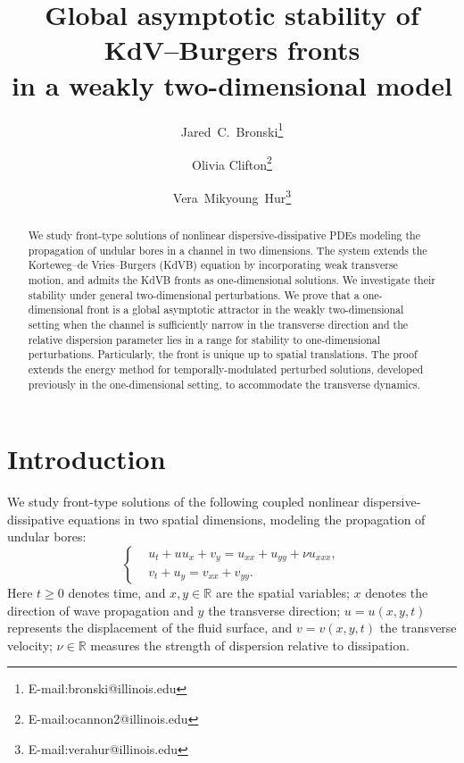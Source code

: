 \documentclass[final,11pt]{article}
\title{Global asymptotic stability of KdV--Burgers fronts \protect\\ 
in a weakly two-dimensional model}
\author[1]{Jared~C.~Bronski\thanks{E-mail:bronski@illinois.edu}}
\author[1]{Olivia Clifton\thanks{E-mail:ocannon2@illinois.edu}}
\author[1]{Vera~Mikyoung~Hur\thanks{E-mail:verahur@illinois.edu}}
\affil[1]{Department of Mathematics, University of Illinois Urbana-Champaign, \protect\\
Urbana, IL 61801, USA}
\renewcommand{\geq}{\geqslant}
\theoremstyle{definition} %
\theoremstyle{plain}
\theoremstyle{definition} %
\theoremstyle{remark}
\begin{document}
\maketitle

\begin{abstract}
We study front-type solutions of nonlinear dispersive-dissipative PDEs modeling the propagation of undular bores in a channel in two dimensions. The system extends the Korteweg--de Vries--Burgers (KdVB) equation by incorporating weak transverse motion, and admits the KdVB fronts as one-dimensional solutions. We investigate their stability under general two-dimensional perturbations. We prove that a one-dimensional front is a global asymptotic attractor in the weakly two-dimensional setting when the channel is sufficiently narrow in the transverse direction and the relative dispersion parameter lies in a range for stability to one-dimensional perturbations. Particularly, the front is unique up to spatial translations. The proof extends the energy method for temporally-modulated perturbed solutions, developed previously in the one-dimensional setting, to accommodate the transverse dynamics.
\end{abstract}

\section{Introduction}\label{sec:intro}
We study front-type solutions of the following coupled nonlinear dispersive-dissipative equations in two spatial dimensions, modeling the propagation of undular bores:
\begin{equation}\label{e:Rajopadhye}
\left\{\begin{aligned}
&u_t  + u u_x  + v_y = u_{xx} + u_{yy} + \nu u_{xxx}, \\
& v_t + u_y = v_{xx}+v_{yy}.
\end{aligned}\right.
\end{equation}
Here $t\geq0$ denotes time, and $x,y\in\mathbb{R}$ are the spatial variables; $x$ denotes the direction of wave propagation and $y$ the transverse direction; $u=u(x,y,t)$ represents the displacement of the fluid surface, and $v=v(x,y,t)$ the transverse velocity; $\nu\in\mathbb{R}$ measures the strength of dispersion relative to dissipation. 
\end{document}
